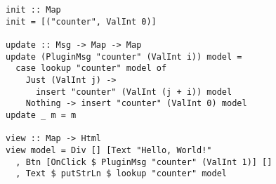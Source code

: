 \begin{verbatim}
init :: Map
init = [("counter", ValInt 0)]

update :: Msg -> Map -> Map
update (PluginMsg "counter" (ValInt i)) model =
  case lookup "counter" model of
    Just (ValInt j) ->
      insert "counter" (ValInt (j + i)) model
    Nothing -> insert "counter" (ValInt 0) model
update _ m = m

view :: Map -> Html
view model = Div [] [Text "Hello, World!"
  , Btn [OnClick $ PluginMsg "counter" (ValInt 1)] []
  , Text $ putStrLn $ lookup "counter" model
\end{verbatim}
